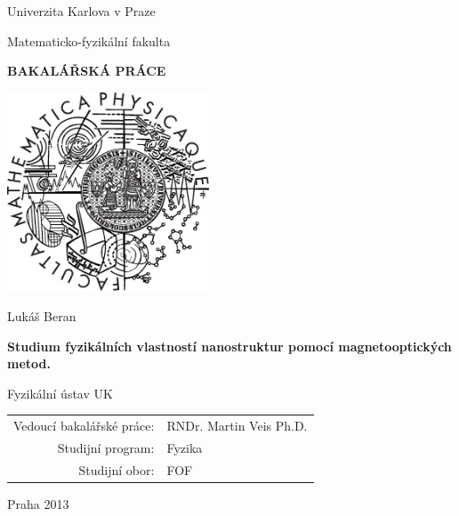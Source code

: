 \documentclass[12pt,a4paper]{report}
\begin{document}


\pagestyle{empty}
\begin{center}

\large

Univerzita Karlova v Praze

\medskip

Matematicko-fyzikální fakulta

\vfill

{\bf\Large BAKALÁŘSKÁ PRÁCE}

\vfill

\centerline{\mbox{\includegraphics[width=60mm]{img/logo.eps}}}

\vfill
\vspace{5mm}

{\LARGE Lukáš Beran}

\vspace{15mm}

{\LARGE\bfseries Studium fyzikálních vlastností nanostruktur pomocí magnetooptických metod.}

\vfill

Fyzikální ústav UK

\vfill

\begin{tabular}{rl}

Vedoucí bakalářské práce: & RNDr. Martin Veis Ph.D. \\
\noalign{\vspace{2mm}}
Studijní program: & Fyzika \\
\noalign{\vspace{2mm}}
Studijní obor: & FOF \\
\end{tabular}

\vfill

Praha 2013

\end{center}
\end{document}
